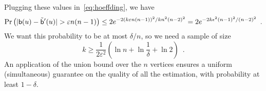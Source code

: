 Plugging these values in~\eqref{eq:hoeffding}, we have
\[
\Pr\left(|\betw(u)-\tilde\betw'(u)|>\varepsilon n(n-1)\right)\leq
2e^{-2(k\varepsilon n(n-1))^2/kn^2(n-2)^2}=2e^{-2k\epsilon^2(n-1)^2/(n-2)^2}\enspace.
\]
We want this probability to be at most $\delta/n$, so we need a sample of size
\[
k\geq \frac{1}{2\varepsilon^2}\left(\ln n
+\ln\frac{1}{\delta} +\ln 2\right)\enspace.
\]
An application of the union bound over the $n$ vertices ensures a uniform
(simultaneous) guarantee on the quality of
all the estimation, with probability at least $1-\delta$.


